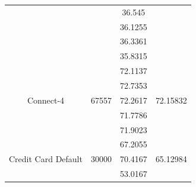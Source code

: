 \documentclass[12pt]{article}
\begin{document}
\begin{table}[]
\begin{tabular}{|c|c|c|c|}
		&                         & 36.545                                                                                           &                             \\ \cline{3-3}
		&                         & 36.1255                                                                                          &                             \\ \cline{3-3}
		&                         & 36.3361                                                                                          &                             \\ \cline{3-3}
		&                         & 35.8315                                                                                          &                             \\ \hline
		\multirow{5}{*}{Connect-4}           & \multirow{5}{*}{67557}  & 72.1137                                                                                          & \multirow{5}{*}{72.15832}   \\ \cline{3-3}
		&                         & 72.7353                                                                                          &                             \\ \cline{3-3}
		&                         & 72.2617                                                                                          &                             \\ \cline{3-3}
		&                         & 71.7786                                                                                          &                             \\ \cline{3-3}
		&                         & 71.9023                                                                                          &                             \\ \hline
		\multirow{5}{*}{Credit Card Default} & \multirow{5}{*}{30000}  & 67.2055                                                                                          & \multirow{5}{*}{65.12984}   \\ \cline{3-3}
		&                         & 70.4167                                                                                          &                             \\ \cline{3-3}
		&                         & 53.0167                                                                                          &                             \\ \cline{3-3}

\end{tabular}
\end{table}
\end{document}
